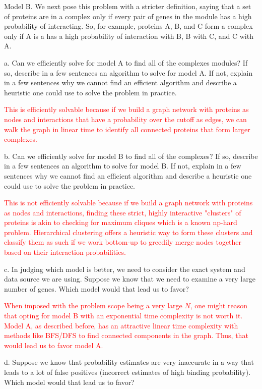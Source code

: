 \documentclass[11pt]{article}
\begin{document}
Model B.  We next pose this problem with a stricter definition, saying
that a set of proteins are in a complex only if every pair
of genes in the module has a high probability of interacting.  So, for example,
proteins A, B, and C form a complex only if A is a has a high probability of interaction with B, B with C, and C with A.

a. Can we efficiently solve for model A to find all of the
complexes modules?  If so, describe in a few sentences an algorithm
to solve for model A.  If not, explain in a few sentences why we
cannot find an efficient algorithm and describe a heuristic one could
use to solve the problem in practice.

\textcolor{red}{
This is efficiently solvable because if we build a graph network with proteins as nodes and interactions that have a probability over the cutoff as edges, we can walk the graph in linear time to identify all connected proteins that form larger complexes.
}

b. Can we efficiently solve for model B to find all of the
complexes?  If so, describe in a few sentences an algorithm
to solve for model B.  If not, explain in a few sentences why we
cannot find an efficient algorithm and describe a heuristic one could
use to solve the problem in practice.

\textcolor{red}{
This is not efficiently solvable because if we build a graph network with proteins as nodes and interactions, finding these strict, highly interactive "clusters" of proteins is akin to checking for maximum cliques which is a known np-hard problem. Hierarchical clustering offers a heuristic way to form these clusters and classify them as such if we work bottom-up to greedily merge nodes together based on their interaction probabilities.
}

c. In judging which model is better, we need to consider the exact
system and data source we are using.  Suppose we know that we need to
examine a very large number of genes.  Which model would that lead us
to favor?

\textcolor{red}{
When imposed with the problem scope being a very large $N$, one might reason that opting for model B with an exponential time complexity is not worth it. Model A, as described before, has an attractive linear time complexity with methods like BFS/DFS to find connected components in the graph. Thus, that would lead us to favor model A.
}

d. Suppose we know that probability estimates are very inaccurate in a way that leads to a lot of false positives (incorrect estimates of high binding probability).  Which model would that lead us to favor?
\end{document}
